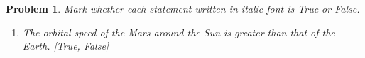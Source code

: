 \documentclass[10pt]{article}
\theoremstyle{plain}\theorembodyfont{\normalfont}
\newtheorem{prob}{Problem}[section]
\renewcommand{\theprob}{\arabic{prob}}
\newenvironment{subprob}%
{\renewcommand{\theenumi}{\alph{enumi}}\renewcommand{\labelenumi}{(\theenumi)}\begin{enumerate}}%
{\end{enumerate}}%
\begin{document}
\renewcommand{\theprob}{\arabic{prob} \textit{(3pt)}}
\begin{prob}
Mark whether each statement written in \textit{italic font} is True or False.
\begin{subprob}


\item \textit{The orbital speed of the Mars around the Sun is greater than that of the Earth.} [True, False]
%
%
%
%
%
%
%
%

%
%
%


\end{subprob}
\end{prob}
\end{document}

